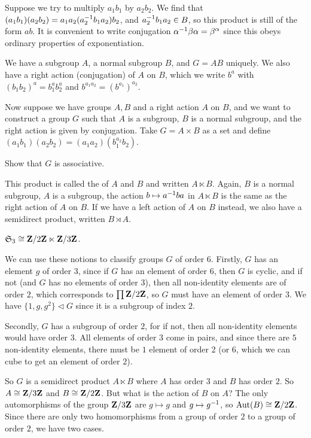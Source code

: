 \documentclass[11pt, twoside]{amsart}
\begin{document}
Suppose we try to multiply $a_1b_1$ by $a_2b_2$. We find that $(a_1b_1)(a_2b_2) = a_1a_2(a_2^{-1} b_1a_2) b_2$, and $a_2^{-1} b_1a_2\in B$, so this product is still of the form $ab$. It is convenient to write conjugation $\alpha^{-1} \beta\alpha = \beta^\alpha$ since this obeys ordinary properties of exponentiation. 

We have a subgroup $A$, a normal subgroup $B$, and $G=AB$ uniquely. We also have a right action (conjugation) of $A$ on $B$, which we write $b^a $ with $(b_1b_2)^a = b_1^a b_2^a$ and $b^{a_1a_2} = (b^{a_1})^{a_2}$.

Now suppose we have groups $A,B$ and a right action $A$ on $B$, and we want to construct a group $G$ such that $A$ is a subgroup, $B$ is a normal subgroup, and the right action is given by conjugation. Take $G = A\times B$ as a set and define $(a_1b_1)(a_2b_2)=(a_1a_2)(b_1^{a_2} b_2)$.
\begin{exercise} 
Show that $G$ is associative. %
\end{exercise}
This product is called the  of $A$ and $B$ and written $A\ltimes B$. Again, $B$ is a normal subgroup, $A$ is a subgroup, the action $b\mapsto a^{-1} b a$ in $A\ltimes B$ is the same as the right action of $A$ on $B$. If we have a left action of $A$ on $B$ instead, we also have a semidirect product, written $B \rtimes A$.

\begin{example}
$\mathfrak{S}_3 \cong \mathbf{Z}/2\mathbf{Z} \ltimes \mathbf{Z}/3\mathbf{Z}$.
\end{example}

We can use these notions to classify groups $G$ of order $6$. Firstly, $G$ has an element $g$ of order $3$, since if $G$ has an element of order $6$, then $G$ is cyclic, and if not (and $G$ has no elements of order $3$), then all non-identity elements are of order $2$, which corresponds to $\prod \mathbf{Z}/2\mathbf{Z}$, so $G$ must have an element of order $3$. We have $\{1,g,g^2\}\lhd G$ since it is a subgroup of index $2$. 

Secondly, $G$ has a subgroup of order $2$, for if not, then all non-identity elements would have order $3$. All elements of order $3$ come in pairs, and since there are $5$ non-identity elements, there must be $1$ element of order $2$ (or $6$, which we can cube to get an element of order $2$). 

So $G$ is a semidirect product $A \ltimes B$ where $A$ has order $3$ and $B$ has order $2$. So $A\cong \mathbf{Z}/3\mathbf{Z}$ and $B\cong \mathbf{Z}/2\mathbf{Z}$. But what is the action of $B$ on $A$?  The only automorphisms of the group $\mathbf{Z}/3\mathbf{Z}$ are $g\mapsto g$ and $g\mapsto g^{-1}$, so $\operatorname{Aut}(B) \cong \mathbf{Z}/2\mathbf{Z}$. Since there are only two homomorphisms from a group of order $2$ to a group of order $2$, we have two cases.
\end{document}

